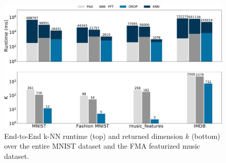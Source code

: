 \begin{figure}
\includegraphics[width=\linewidth]{figs/nonts-revision.pdf}
\caption[]{End-to-End k-NN runtime (top) and returned dimension $k$ (bottom) over the entire MNIST dataset and the FMA featurized music dataset.}
\label{fig:beyond}
\end{figure}

